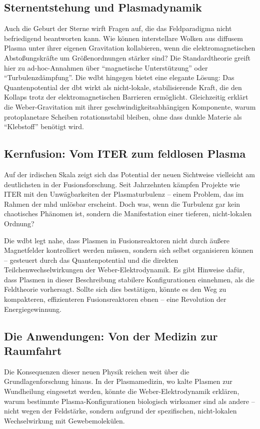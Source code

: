 \subsection{Sternentstehung und Plasmadynamik}
Auch die Geburt der Sterne wirft Fragen auf, die das Feldparadigma nicht befriedigend beantworten kann. Wie können interstellare Wolken aus diffusem Plasma unter ihrer eigenen
Gravitation kollabieren, wenn die elektromagnetischen Abstoßungskräfte um Größenordnungen stärker sind? Die Standardtheorie greift hier zu ad-hoc-Annahmen über
\enquote{magnetische Unterstützung} oder \enquote{Turbulenzdämpfung}. Die \gls{wdbt} hingegen bietet eine elegante Lösung: Das Quantenpotential der \gls{dbt} wirkt als nicht-lokale,
stabilisierende Kraft, die den Kollaps trotz der elektromagnetischen Barrieren ermöglicht. Gleichzeitig erklärt die Weber-Gravitation mit ihrer geschwindigkeitsabhängigen Komponente,
warum protoplanetare Scheiben rotationsstabil bleiben, ohne dass dunkle Materie als \enquote{Klebstoff} benötigt wird.

\subsection{Kernfusion: Vom ITER zum feldlosen Plasma}
Auf der irdischen Skala zeigt sich das Potential der neuen Sichtweise vielleicht am deutlichsten in der Fusionsforschung. Seit Jahrzehnten kämpfen Projekte wie ITER mit den
Unwägbarkeiten der Plasmaturbulenz – einem Problem, das im Rahmen der \gls{mhd} unlösbar erscheint. Doch was, wenn die Turbulenz gar kein chaotisches Phänomen ist,
sondern die Manifestation einer tieferen, nicht-lokalen Ordnung?

Die \gls{wdbt} legt nahe, dass Plasmen in Fusionsreaktoren nicht durch äußere Magnetfelder kontrolliert werden müssen, sondern sich selbst organisieren können – gesteuert durch
das Quantenpotential und die direkten Teilchenwechselwirkungen der Weber-Elektrodynamik. Es gibt Hinweise dafür, dass Plasmen in dieser Beschreibung stabilere Konfigurationen
einnehmen, als die Feldtheorie vorhersagt. Sollte sich dies bestätigen, könnte es den Weg zu kompakteren, effizienteren Fusionsreaktoren ebnen – eine Revolution der Energiegewinnung.

\subsection{Die Anwendungen: Von der Medizin zur Raumfahrt}
Die Konsequenzen dieser neuen Physik reichen weit über die Grundlagenforschung hinaus. In der Plasmamedizin, wo kalte Plasmen zur Wundheilung eingesetzt werden, könnte die
Weber-Elektrodynamik erklären, warum bestimmte Plasma-Konfigurationen biologisch wirksamer sind als andere – nicht wegen der Feldstärke, sondern aufgrund der spezifischen,
nicht-lokalen Wechselwirkung mit Gewebemolekülen.

